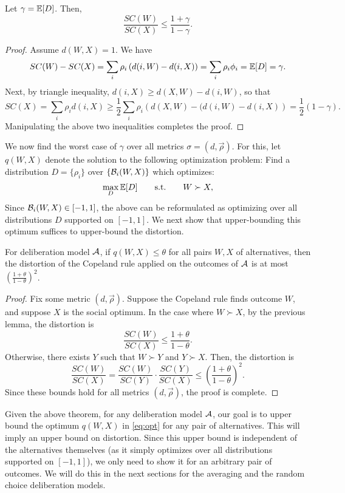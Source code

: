 \begin{lemma} Let $\gamma = \mathbb{E}[D]$. Then,
$$ \frac{SC(W)}{SC(X)} \le \frac{1+\gamma}{1-\gamma}.$$
\end{lemma}
\begin{proof}
Assume $d(W,X) = 1$. We have 
$$SC(W) - SC(X) = \sum_i \rho_i \left(d(i,W) - d(i,X) \right) = \sum_i \rho_i \phi_i = \mathbb{E}[D] = \gamma. $$
Next, by triangle inequality, $d(i,X) \ge d(X,W) - d(i,W)$, so that
$$ SC(X) = \sum_i \rho_i d(i,X) \ge \frac{1}{2} \sum_i \rho_i \left(d(X,W) - (d(i,W) - d(i,X) \right) = \frac{1}{2} \left(1 - \gamma \right). $$
Manipulating the above two inequalities completes the proof.
\end{proof}

We now find the worst case of $\gamma$ over all metrics $\sigma = (d, \vec{\rho})$. For this, let $q(W,X)$ denote the solution to the following optimization problem: Find a distribution $D = \{\rho_i\}$ over $\{\mathcal{B}_i(W,X)\}$ which optimizes:
\begin{equation} 
\label{eq:opt}
\max_D \mathbb{E}[D] \qquad \mbox{s.t.} \qquad W \succ X,
\end{equation}
Since $\mathcal{B}_i(W,X) \in [-1,1]$, the above can be reformulated as optimizing over all distributions $D$ supported on $[-1,1]$.  We next show that upper-bounding this optimum  suffices to upper-bound the distortion. 

\begin{theorem}
\label{thm:distort1}
For deliberation model $\mathcal{A}$, if $q(W,X) \le \theta$ for all pairs $W,X$ of alternatives, then the distortion of the Copeland rule applied on the outcomes of $\mathcal{A}$ is at most $ \left( \frac{1 + \theta}{1-\theta}\right)^2$.
\end{theorem}
\begin{proof}
    Fix some metric $(d,\vec{\rho})$. Suppose the Copeland rule finds outcome $W$, and suppose $X$ is the social optimum. In the case where $W \succ X$, by the previous lemma, the distortion is 
    $$\frac{SC(W)}{SC(X)} \le \frac{1 + \theta}{1-\theta}.$$ 
    Otherwise, there exists $Y$ such that $W \succ Y$ and $Y \succ X$. Then, the distortion is 
    $$ \frac{SC(W)}{SC(X)} = \frac{SC(W)}{SC(Y)} \cdot \frac{SC(Y)}{SC(X)} \le  \left( \frac{1 + \theta}{1-\theta}\right)^2. $$
    Since these bounds hold for all metrics $(d,\vec{\rho})$, the proof is complete.
\end{proof}

Given the above theorem, for any deliberation model $\mathcal{A}$,  our goal is to upper bound the optimum $q(W,X)$ in \cref{eq:opt} for any pair of alternatives. This will imply an upper bound on distortion. Since this upper bound is independent of the alternatives themselves (as it simply optimizes over all distributions supported on $[-1,1]$), we only need to show it for an arbitrary pair of outcomes. We will do this in the next sections for the averaging and the random choice deliberation models.

